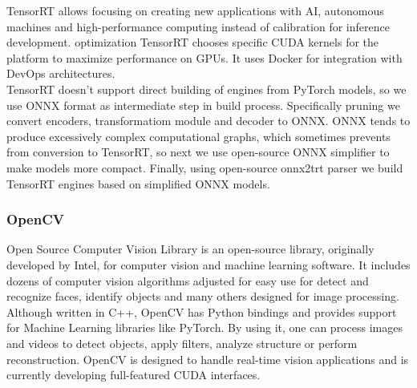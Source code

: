 \documentclass[../Main.tex]{subfiles}
\begin{document}
    TensorRT allows focusing on creating new applications with AI, autonomous machines
    and high-performance computing instead of calibration for inference development.
     optimization TensorRT chooses specific CUDA kernels for the platform to maximize
    performance on GPUs. It uses Docker for integration with DevOps architectures.\\
    TensorRT doesn't support direct building of engines from PyTorch models, so 
    we use ONNX format as intermediate step in build process. Specifically
     pruning we convert encoders, transformatiom module and decoder to ONNX. 
    ONNX tends to produce excessively complex computational graphs, which sometimes
    prevents from conversion to TensorRT, so next we use open-source ONNX simplifier 
    \cite{onnxsim} to make models more compact. Finally, using open-source
    onnx2trt parser \cite{onnx2trt} we build TensorRT engines based on simplified
    ONNX models.
    

    \subsubsection{OpenCV}
    Open Source Computer Vision Library is an open-source library, originally developed by Intel, for computer vision and machine learning software. It includes dozens of computer vision algorithms adjusted for easy use for detect and recognize faces, identify objects and many others designed for image processing. Although written in C++, OpenCV has Python bindings and provides support for Machine Learning libraries like PyTorch.  By using it, one can process images and videos to detect objects, apply filters, analyze structure or perform reconstruction. OpenCV is designed to handle real-time vision applications and is currently developing full-featured CUDA interfaces.
\end{document}
